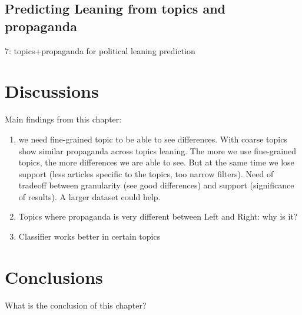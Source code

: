 


\subsection{Predicting Leaning from topics and propaganda}
\label{sec:topic_classifier_propaganda_2}

7: topics+propaganda for political leaning prediction

\section{\statusred Discussions}
\label{sec:topic_discussion}

Main findings from this chapter:

\begin{enumerate}
    \item we need fine-grained topic to be able to see differences. With coarse topics show similar propaganda across topics leaning. The more we use fine-grained topics, the more differences we are able to see. But at the same time we lose support (less articles specific to the topics, too narrow filters). Need of tradeoff between granularity (see good differences) and support (significance of results). A larger dataset could help.
    \item Topics where propaganda is very different between Left and Right: why is it?
    \item Classifier works better in certain topics
\end{enumerate}


\section{Conclusions}
\label{sec:topic_conclusion}

What is the conclusion of this chapter?